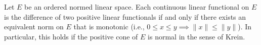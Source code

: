 Let $E$ be an ordered normed linear space. Each continuous linear functional on $E$ is the difference of two positive linear functionals if and only if there exists an equivalent norm on $E$ that is monotonic (i.e., $0 \leq x \leq y \implies \|x\| \leq \|y\|$). In particular, this holds if the positive cone of $E$ is normal in the sense of Krein.
